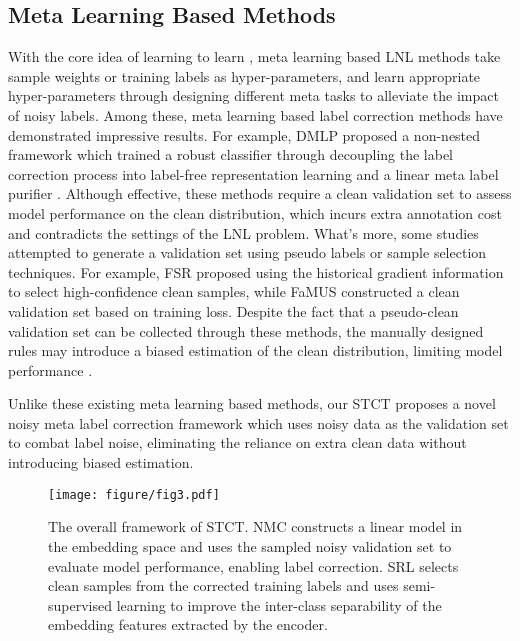 \subsection{Meta Learning Based Methods}
With the core idea of learning to learn \cite{meta_learning_survey}, meta learning based LNL methods take sample weights \cite{meta_weight1, meta_weight2, meta_weight3} or training labels \cite{mlc, mlnt, mslc, dmlp, cto} as hyper-parameters, and learn appropriate hyper-parameters through designing different meta tasks to alleviate the impact of noisy labels. Among these, meta learning based label correction methods have demonstrated impressive results. For example, DMLP proposed a non-nested framework which trained a robust classifier through decoupling the label correction process into label-free representation learning and a linear meta label purifier \cite{dmlp}. Although effective, these methods require a clean validation set to assess model performance on the clean distribution, which incurs extra annotation cost and contradicts the settings of the LNL problem. What's more, some studies attempted to generate a validation set using pseudo labels or sample selection techniques. For example, FSR \cite{noisy_val1} proposed using the historical gradient information to select high-confidence clean samples, while FaMUS \cite{noisy_val2} constructed a clean validation set based on training loss. Despite the fact that a pseudo-clean validation set can be collected through these methods, the manually designed rules may introduce a biased estimation of the clean distribution, limiting model performance \cite{theory1}.

Unlike these existing meta learning based methods, our STCT proposes a novel noisy meta label correction framework which uses noisy data as the validation set to combat label noise, eliminating the reliance on extra clean data without introducing biased estimation.

\begin{figure*}[]
    \centering
    \texttt{[image: figure/fig3.pdf]}
    \caption{The overall framework of STCT. NMC constructs a linear model in the embedding space and uses the sampled noisy validation set to evaluate model performance, enabling label correction. SRL selects clean samples from the corrected training labels and uses semi-supervised learning to improve the inter-class separability of the embedding features extracted by the encoder.}
    \label{fig:diagram_method}
\end{figure*}